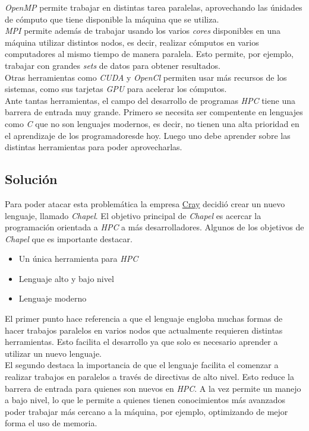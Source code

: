 \documentclass[10pt]{extarticle}
\begin{document}
\textit{OpenMP} permite trabajar en distintas tarea paralelas, aprovechando las únidades de cómputo que tiene disponible la máquina que se utiliza.\\
\textit{MPI} permite además de trabajar usando los varios \textit{cores} disponibles en una máquina utilizar distintos nodos, es decir, realizar cómputos en varios computadores al mismo tiempo de manera paralela. Esto permite, por ejemplo, trabajar con grandes \textit{sets} de datos para obtener resultados.\\
Otras herramientas como \textit{CUDA} y \textit{OpenCl} permiten usar más recursos de los sistemas, como sus tarjetas \textit{GPU} para acelerar los cómputos.\\

Ante tantas herramientas, el campo del desarrollo de programas \textit{HPC} tiene una barrera de entrada muy grande. Primero se necesita ser compentente en lenguajes como \textit{C} que no son lenguajes modernos, es decir, no tienen una alta prioridad en el aprendizaje de los programadoresde hoy. Luego uno debe aprender sobre las distintas herramientas para poder aprovecharlas.

\subsection*{Solución}
Para poder atacar esta problemática la empresa \href{http://www.cray.com}{\color{blue!60}Cray} decidió crear un nuevo lenguaje, llamado \textit{Chapel}. El objetivo principal de \textit{Chapel} es acercar la programación orientada a \textit{HPC} a más desarrolladores. Algunos de los objetivos de \textit{Chapel} que es importante destacar.

\begin{itemize}
 \item Un única herramienta para \textit{HPC}
 \item Lenguaje alto y bajo nivel
 \item Lenguaje moderno
\end{itemize}

El primer punto hace referencia a que el lenguaje engloba muchas formas de hacer trabajos paralelos en varios nodos que actualmente requieren distintas herramientas. Esto facilita el desarrollo ya que solo es necesario aprender a utilizar un nuevo lenguaje.\\

El segundo destaca la importancia de que el lenguaje facilita el comenzar a realizar trabajos en paralelos a través de directivas de alto nivel. Esto reduce la barrera de entrada para quienes son nuevos en \textit{HPC}. A la vez permite un manejo a bajo nivel, lo que le permite a quienes tienen conocimientos más avanzados poder trabajar más cercano a la máquina, por ejemplo, optimizando de mejor forma el uso de memoria.
\end{document}
